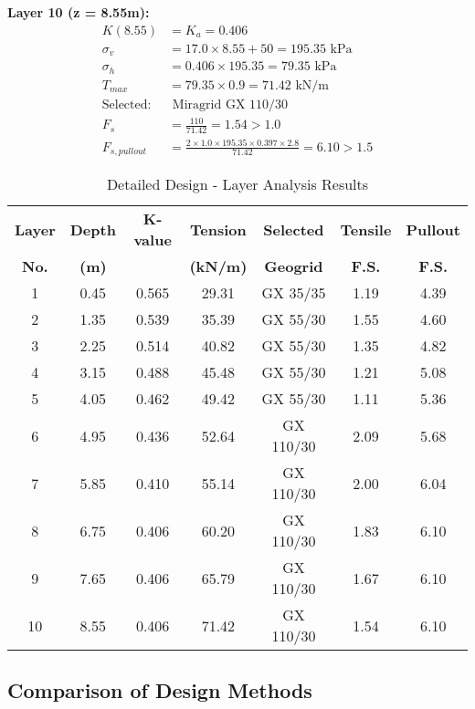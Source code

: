 \documentclass[10pt,a4paper,twocolumn]{article}
\begin{document}
\textbf{Layer 10 (z = 8.55m):}
\begin{align}
K(8.55) &= K_a = 0.406 \\
\sigma_v &= 17.0 \times 8.55 + 50 = 195.35 \text{ kPa} \\
\sigma_h &= 0.406 \times 195.35 = 79.35 \text{ kPa} \\
T_{max} &= 79.35 \times 0.9 = 71.42 \text{ kN/m} \\
\text{Selected:} &\text{ Miragrid GX 110/30} \\
F_s &= \frac{110}{71.42} = 1.54 > 1.0 \\
F_{s,pullout} &= \frac{2 \times 1.0 \times 195.35 \times 0.397 \times 2.8}{71.42} = 6.10 > 1.5
\end{align}
\begin{table}[htbp]
\centering
\caption{Detailed Design - Layer Analysis Results}
\label{tab:detailed_design}
\begin{tabular}{|c|c|c|c|c|c|c|}
\hline
\textbf{Layer} & \textbf{Depth} & \textbf{K-value} & \textbf{Tension} & \textbf{Selected} & \textbf{Tensile} & \textbf{Pullout} \\
\textbf{No.} & \textbf{(m)} & & \textbf{(kN/m)} & \textbf{Geogrid} & \textbf{F.S.} & \textbf{F.S.} \\
\hline
1 & 0.45 & 0.565 & 29.31 & GX 35/35 & 1.19 & 4.39 \\
\hline
2 & 1.35 & 0.539 & 35.39 & GX 55/30 & 1.55 & 4.60 \\
\hline
3 & 2.25 & 0.514 & 40.82 & GX 55/30 & 1.35 & 4.82 \\
\hline
4 & 3.15 & 0.488 & 45.48 & GX 55/30 & 1.21 & 5.08 \\
\hline
5 & 4.05 & 0.462 & 49.42 & GX 55/30 & 1.11 & 5.36 \\
\hline
6 & 4.95 & 0.436 & 52.64 & GX 110/30 & 2.09 & 5.68 \\
\hline
7 & 5.85 & 0.410 & 55.14 & GX 110/30 & 2.00 & 6.04 \\
\hline
8 & 6.75 & 0.406 & 60.20 & GX 110/30 & 1.83 & 6.10 \\
\hline
9 & 7.65 & 0.406 & 65.79 & GX 110/30 & 1.67 & 6.10 \\
\hline
10 & 8.55 & 0.406 & 71.42 & GX 110/30 & 1.54 & 6.10 \\
\hline
\end{tabular}
\end{table}



\subsection{Comparison of Design Methods}
\end{document}
